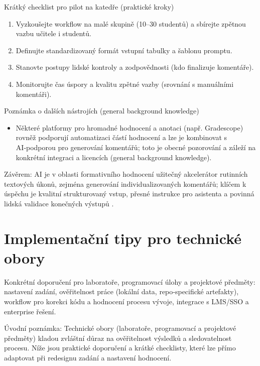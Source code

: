 \documentclass{report}%
\begin{document}
Krátký checklist pro pilot na katedře (praktické kroky)
\begin{enumerate}
  \item Vyzkoušejte workflow na malé skupině (10–30 studentů) a sbírejte zpětnou vazbu učitele i studentů.
  \item Definujte standardizovaný formát vstupní tabulky a šablonu promptu.
  \item Stanovte postupy lidské kontroly a zodpovědnosti (kdo finalizuje komentáře).
  \item Monitorujte čas úspory a kvalitu zpětné vazby (srovnání s manuálními komentáři).
\end{enumerate}

Poznámka o dalších nástrojích (general background knowledge)
\begin{itemize}
  \item Některé platformy pro hromadné hodnocení a anotaci (např. Gradescope) rovněž podporují automatizaci částí hodnocení a lze je kombinovat s AI‑podporou pro generování komentářů; toto je obecné pozorování a záleží na konkrétní integraci a licencích (general background knowledge).
\end{itemize}

Závěrem: AI je v oblasti formativního hodnocení užitečný akcelerátor rutinních textových úkonů, zejména generování individualizovaných komentářů; klíčem k úspěchu je kvalitní strukturovaný vstup, přesné instrukce pro asistenta a povinná lidská validace konečných výstupů \cite{kb_ai_101_tipu_pdf_04e4a115_page_21_2, kb_ai_101_tipu_pdf_04e4a115_page_8_1}.%

%
\section{Implementační tipy pro technické obory}%
Konkrétní doporučení pro laboratoře, programovací úlohy a projektové předměty: nastavení zadání, ověřitelnost práce (lokální data, repo‑specifické artefakty), workflow pro korekci kódu a hodnocení procesu vývoje, integrace s LMS/SSO a enterprise řešení.%


%
Úvodní poznámka: Technické obory (laboratoře, programovací a projektové předměty) kladou zvláštní důraz na ověřitelnost výsledků a sledovatelnost procesu. Níže jsou praktické doporučení a krátké checklisty, které lze přímo adaptovat při redesignu zadání a nastavení hodnocení.
\end{document}
